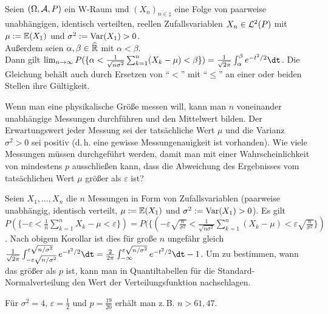 \begin{Kor}\\
    Seien $(\Omega, \mathcal{A}, P)$ ein W-Raum und $(X_n)_{n \in \natural}$
    eine Folge von paarweise unabhängigen, identisch verteilten,
    reellen Zufallsvariablen $X_n \in \mathcal{L}^2(P)$ mit $\mu := \mathbb{E}(X_1)$ und
    $\sigma^2 := \text{Var}(X_1) > 0$.\\
    Außerdem seien $\alpha, \beta \in \widehat{\mathbb{R}}$ mit $\alpha < \beta$.\\
    Dann gilt $\lim_{n \to \infty}
    P(\{\alpha < \frac{1}{\sqrt{n\sigma^2}} \sum_{k=1}^n (X_k - \mu) < \beta\}) =
    \frac{1}{\sqrt{2\pi}} \int_\alpha^\beta e^{-t^2/2} \dt$.
    Die Gleichung behält auch durch Ersetzen von "`$<$"' mit "`$\le$"' an einer oder beiden
    Stellen ihre Gültigkeit.
\end{Kor}

\linie

\begin{Bsp}
    Wenn man eine physikalische Größe messen will,
    kann man $n$ voneinander unabhängige Messungen durchführen und den Mittelwert bilden.
    Der Erwartungswert jeder Messung sei der tatsächliche Wert $\mu$ und
    die Varianz $\sigma^2 > 0$ sei positiv (d.\,h. eine gewisse Messungenauigkeit ist vorhanden).
    Wie viele Messungen müssen durchgeführt werden, damit man mit einer Wahrscheinlichkeit von
    mindestens $p$ ausschließen kann, dass die Abweichung des Ergebnisses vom tatsächlichen
    Wert $\mu$ größer als $\varepsilon$ ist?
    
    Seien $X_1, \dotsc, X_n$ die $n$ Messungen in Form von Zufallsvariablen
    (paarweise unabhängig, identisch verteilt, $\mu := \mathbb{E}(X_1)$ und $\sigma^2 := \text{Var}(X_1) > 0$).
    Es gilt $P(\{-\varepsilon < \frac{1}{n} \sum_{k=1}^n X_k - \mu < \varepsilon\}) =
    P(\{(-\varepsilon\sqrt{\frac{n}{\sigma^2}} <
    \frac{1}{\sqrt{n\sigma^2}} \sum_{k=1}^n (X_k - \mu) <
    \varepsilon\sqrt{\frac{n}{\sigma^2}}\})$.
    Nach obigem Korollar ist dies für große $n$ ungefähr gleich
    $\frac{1}{\sqrt{2\pi}} \int_{-\varepsilon\sqrt{n/\sigma^2}}^{\varepsilon\sqrt{n/\sigma^2}}
    e^{-t^2/2} \dt = \frac{2}{2\pi}
    \int_{-\infty}^{\varepsilon\sqrt{n/\sigma^2}} e^{-t^2/2} \dt - 1$.
    Um zu bestimmen, wann das größer als $p$ ist, kann man in Quantiltabellen für die
    Standard-Normalverteilung den Wert der Verteilungsfunktion nachschlagen.
    
    Für $\sigma^2 = 4$, $\varepsilon = \frac{1}{2}$ und $p = \frac{19}{20}$ erhält man z.\,B.
    $n > 61{,}47$.
\end{Bsp}

